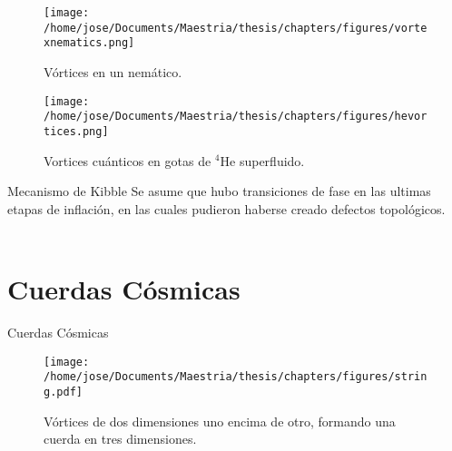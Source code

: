 \documentclass[14pt]{beamer}
\begin{document}
\begin{frame}
\begin{figure}
\centering
	\texttt{[image: /home/jose/Documents/Maestria/thesis/chapters/figures/vortexnematics.png]}
	\caption{Vórtices en un nemático.}
	\label{fig:vortexnematic}
\end{figure}
\end{frame}

\begin{frame}
\begin{figure}
	\centering
	\texttt{[image: /home/jose/Documents/Maestria/thesis/chapters/figures/hevortices.png]}
	\caption{Vortices cuánticos en gotas de $^4$He superfluido.}
	\label{fig:heliumvortices}
\end{figure} 
\end{frame}


\begin{frame}{Mecanismo de Kibble}
Se asume que hubo transiciones de fase en las ultimas etapas de inflación, en las cuales pudieron haberse creado defectos topológicos. \\~\


\end{frame}



\section{Cuerdas Cósmicas}
\begin{frame}{Cuerdas Cósmicas}
\begin{figure}
	\centering
	\texttt{[image: /home/jose/Documents/Maestria/thesis/chapters/figures/string.pdf]}
	\caption{Vórtices de dos dimensiones uno encima de otro, formando una cuerda en tres dimensiones.}
	\label{fig:string}
\end{figure}
\end{frame}
\end{document}
